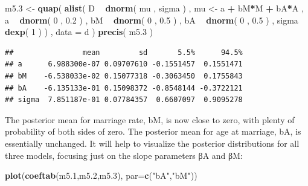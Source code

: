 \documentclass[
]{article}
\newenvironment{Shaded}{\begin{snugshade}}{\end{snugshade}}
\newcommand{\DataTypeTok}[1]{\textcolor[rgb]{0.13,0.29,0.53}{#1}}
\newcommand{\DecValTok}[1]{\textcolor[rgb]{0.00,0.00,0.81}{#1}}
\newcommand{\FloatTok}[1]{\textcolor[rgb]{0.00,0.00,0.81}{#1}}
\newcommand{\KeywordTok}[1]{\textcolor[rgb]{0.13,0.29,0.53}{\textbf{#1}}}
\newcommand{\NormalTok}[1]{#1}
\newcommand{\OperatorTok}[1]{\textcolor[rgb]{0.81,0.36,0.00}{\textbf{#1}}}
\newcommand{\StringTok}[1]{\textcolor[rgb]{0.31,0.60,0.02}{#1}}
\begin{document}
\begin{Shaded}
\begin{Highlighting}[]
\NormalTok{m5}\FloatTok{.3}\NormalTok{ <-}\StringTok{ }\KeywordTok{quap}\NormalTok{(}
    \KeywordTok{alist}\NormalTok{(}
\NormalTok{        D }\OperatorTok{~}\StringTok{ }\KeywordTok{dnorm}\NormalTok{( mu , sigma ) ,}
\NormalTok{        mu <-}\StringTok{ }\NormalTok{a }\OperatorTok{+}\StringTok{ }\NormalTok{bM}\OperatorTok{*}\NormalTok{M }\OperatorTok{+}\StringTok{ }\NormalTok{bA}\OperatorTok{*}\NormalTok{A ,}
\NormalTok{        a }\OperatorTok{~}\StringTok{ }\KeywordTok{dnorm}\NormalTok{( }\DecValTok{0}\NormalTok{ , }\FloatTok{0.2}\NormalTok{ ) ,}
\NormalTok{        bM }\OperatorTok{~}\StringTok{ }\KeywordTok{dnorm}\NormalTok{( }\DecValTok{0}\NormalTok{ , }\FloatTok{0.5}\NormalTok{ ) ,}
\NormalTok{        bA }\OperatorTok{~}\StringTok{ }\KeywordTok{dnorm}\NormalTok{( }\DecValTok{0}\NormalTok{ , }\FloatTok{0.5}\NormalTok{ ) ,}
\NormalTok{        sigma }\OperatorTok{~}\StringTok{ }\KeywordTok{dexp}\NormalTok{( }\DecValTok{1}\NormalTok{ )}
\NormalTok{    ) , }\DataTypeTok{data =}\NormalTok{ d )}
\KeywordTok{precis}\NormalTok{( m5}\FloatTok{.3}\NormalTok{ )}
\end{Highlighting}
\end{Shaded}

\begin{verbatim}
##                mean         sd       5.5%      94.5%
## a      6.988300e-07 0.09707610 -0.1551457  0.1551471
## bM    -6.538033e-02 0.15077318 -0.3063450  0.1755843
## bA    -6.135133e-01 0.15098372 -0.8548144 -0.3722121
## sigma  7.851187e-01 0.07784357  0.6607097  0.9095278
\end{verbatim}

The posterior mean for marriage rate, bM, is now close to zero, with
plenty of probability of both sides of zero. The posterior mean for age
at marriage, bA, is essentially unchanged. It will help to visualize the
posterior distributions for all three models, focusing just on the slope
parameters βA and βM:

\begin{Shaded}
\begin{Highlighting}[]
\KeywordTok{plot}\NormalTok{(}\KeywordTok{coeftab}\NormalTok{(m5}\FloatTok{.1}\NormalTok{,m5}\FloatTok{.2}\NormalTok{,m5}\FloatTok{.3}\NormalTok{), }\DataTypeTok{par=}\KeywordTok{c}\NormalTok{(}\StringTok{"bA"}\NormalTok{,}\StringTok{"bM"}\NormalTok{))}
\end{Highlighting}
\end{Shaded}
\end{document}

